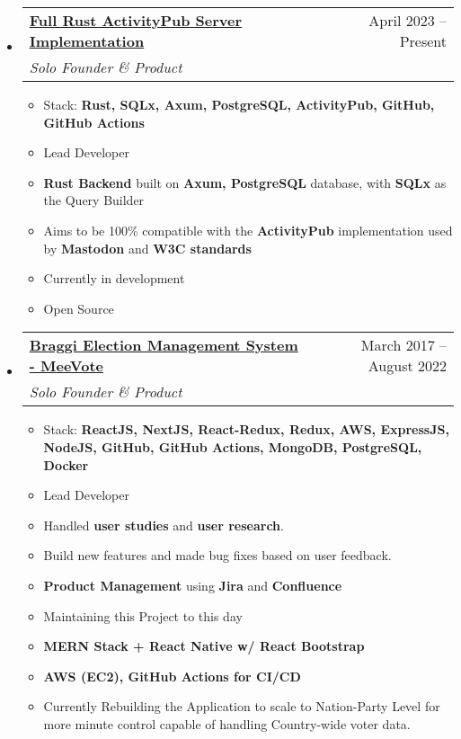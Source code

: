 \documentclass[a4paper,11pt]{article}
\makeatletter
\newcommand{\resumeItem}[1]{
  \item\large{#1}
}
\newcommand{\resumeItemListStart}{\begin{itemize}[rightmargin=0.11in]}
\newcommand{\resumeItemListEnd}{\end{itemize}}
\newcommand{\resumeQuadHeading}[4]{
  \item
  \begin{tabular*}{0.96\textwidth}[t]{l@{\extracolsep{\fill}}r}
    \textbf{#1} & #2 \\
    \textit{\large#3} & \textit{\large #4} \\
  \end{tabular*}
}
\newcommand{\resumeHeadingListStart}{
  \begin{itemize}[leftmargin=0.15in, label={}]
}
\newcommand{\resumeHeadingListEnd}{\end{itemize}}
\makeatother
\begin{document}
  \resumeHeadingListStart{}
  \resumeQuadHeading{\href{https://github.com/SushritPasupuleti/Rusty-Activity-Pub}{\uline{Full Rust ActivityPub Server Implementation
}}}{April 2023 -- Present}
  {Solo Founder \& Product}{}
      \resumeItemListStart{}
		\large{A full ActivityPub Server Implementation built in Rust, without any external dependencies. the ActivityPub protocol is a W3C standard, this allows for interoperability with other ActivityPub implementations such as Mastodon, Pleroma, Pixelfed, etc. This repo could be used to bootstrap a basic ActivityPub platform that could sync with the previously mention services as well.
}
		\resumeItem{Stack: \textbf{Rust,
			SQLx,
			Axum,
			PostgreSQL,
			ActivityPub,
			GitHub,
			GitHub Actions}}
		\resumeItem{Lead Developer}
		\resumeItem{\textbf{Rust Backend} built on \textbf{Axum, PostgreSQL} database, with \textbf{SQLx} as the Query Builder}
		\resumeItem{Aims to be 100\% compatible with the \textbf{ActivityPub} implementation used by \textbf{Mastodon} and \textbf{W3C standards}}
		\resumeItem{Currently in development}
		\resumeItem{Open Source}
      \resumeItemListEnd{}
  \resumeHeadingListEnd{}

  \resumeHeadingListStart{}
  \resumeQuadHeading{{\uline{Braggi Election Management System - MeeVote
}}}{March 2017 -- August 2022}
  {Solo Founder \& Product}{}
      \resumeItemListStart{}
		\large{This was the first project that I built, which was out of my domain, the platform "MeeVote", is an Election Management System, built for those contesting in elections. MeeVote aims to help leaders better manage their party workers to ensure faster reach and acquisition of voters. Also since it's me, under the hood there's some fancy AI magic happening too! This is currently under going a major rewrite for Country-wide deployment and support for multiple national parties.
}
		\resumeItem{Stack: \textbf{ReactJS,
			NextJS,
			React-Redux,
			Redux,
			AWS,
			ExpressJS,
			NodeJS,
			GitHub,
			GitHub Actions,
			MongoDB,
			PostgreSQL,
			Docker}}
		\resumeItem{Lead Developer}
\resumeItem{Handled \textbf{user studies} and \textbf{user research}.}
		\resumeItem{Build new features and made bug fixes based on user feedback.}
		\resumeItem{\textbf{Product Management} using \textbf{Jira} and \textbf{Confluence}}
		\resumeItem{Maintaining this Project to this day}
		\resumeItem{\textbf{MERN Stack + React Native w/ React Bootstrap}}
		\resumeItem{\textbf{AWS (EC2), GitHub Actions for CI/CD}}
		\resumeItem{Currently Rebuilding the Application to scale to Nation-Party Level for more minute control capable of handling Country-wide voter data.}
      \resumeItemListEnd{}
  \resumeHeadingListEnd{}
\end{document}

